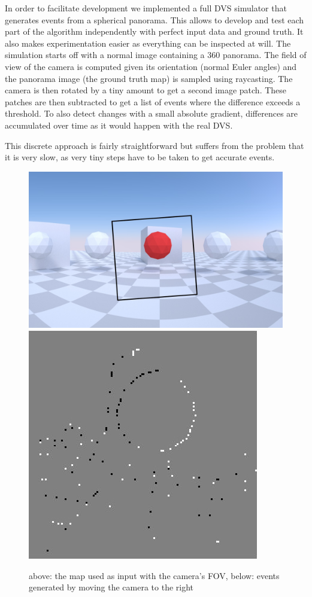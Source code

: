 In order to facilitate development we implemented a full DVS simulator that
generates events from a spherical panorama.  This allows to develop and test
each part of the algorithm independently with perfect input data and ground
truth. It also makes experimentation easier as everything can be inspected at
will.
The simulation starts off with a normal image containing a 360\textdegree
panorama. The field of view of the camera is computed given its orientation
(normal Euler angles) and the panorama image (the ground truth map) is sampled
using raycasting. The camera is then rotated by a tiny amount to get a second
image patch. These patches are then subtracted to get a list of events where
the difference exceeds a threshold. To also detect changes with a small
absolute gradient, differences are accumulated over time as it would happen
with the real DVS.

This discrete approach is fairly straightforward but suffers from the problem
that it is very slow, as very tiny steps have to be taken to get accurate events.

\begin{figure}
\includegraphics[width=\linewidth]{images/simulation_raw.jpg}
\includegraphics[width=\linewidth]{images/simulation_events.jpg}
\caption{above: the map used as input with the camera's FOV, below: events generated by moving the camera to the right}
\label{fig:simulation}
\end{figure}
